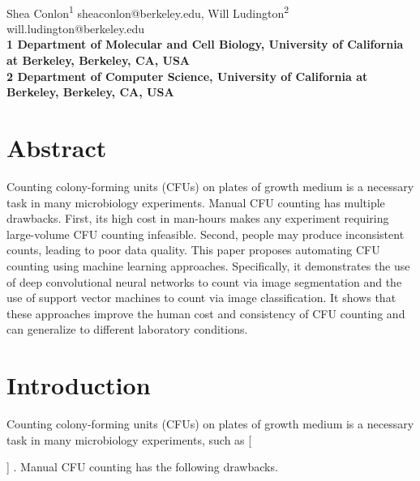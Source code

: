\documentclass[10pt,letterpaper]{article}
\date{}
\newcommand{\fillin}[1]{
    \IfEqCase{#1}{%
        {short}{\_}%
        {long}{\_\_\_\_\_}%
    }[\PackageError{fillin}{Undefined option to fillin: #1}{}]
}
\begin{document}
\vspace*{0.35in}

\begin{flushleft}
{\Large
\textbf{}
}
\newline
\\
Shea Conlon\textsuperscript{1} sheaconlon@berkeley.edu,
Will Ludington\textsuperscript{2} will.ludington@berkeley.edu
\\
\bigskip
\bf{1} Department of Molecular and Cell Biology, University of California at Berkeley, Berkeley, CA, USA
\\
\bf{2} Department of Computer Science, University of California at Berkeley, Berkeley, CA, USA
\\
\bigskip
\end{flushleft}
\section*{Abstract}
    Counting colony-forming units (CFUs) on plates of growth medium is a necessary task in many microbiology experiments. Manual CFU counting has multiple drawbacks. First, its high cost in man-hours makes any experiment requiring large-volume CFU counting infeasible. Second, people may produce inconsistent counts, leading to poor data quality. This paper proposes automating CFU counting using machine learning approaches. Specifically, it demonstrates the use of deep convolutional neural networks to count via image segmentation and the use of support vector machines to count via image classification. It shows that these approaches improve the human cost and consistency of CFU counting and can generalize to different laboratory conditions.

\linenumbers

\section*{Introduction}
    Counting colony-forming units (CFUs) on plates of growth medium is a necessary task in many microbiology experiments, such as \fillin{long}. Manual CFU counting has the following drawbacks.
\end{document}
